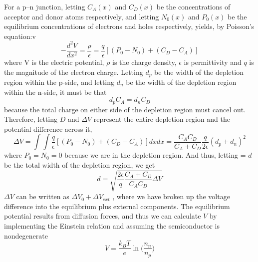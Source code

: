 For a p–n junction, letting  $C_A(x)$ and $C_D(x)$ be the concentrations of acceptor and donor atoms respectively, and letting  $N_0(x)$ and $P_0(x)$ be the equilibrium concentrations of electrons and holes respectively, yields, by Poisson's equation:v
$$
-\frac{d^2V}{dx^2} = \frac{\rho}{\epsilon} = \frac{q}{\epsilon}[(P_0 - N_0) + (C_D - C_A)]
$$
where V is the electric potential, $\rho$ is the charge density, $\epsilon$ is permittivity and $q$ is the magnitude of the electron charge. Letting $d_p$  be the width of the depletion region within the p-side, and letting $d_n$ be the width of the depletion region within the n-side, it must be that
$$
d_pC_A = d_nC_D
$$
because the total charge on either side of the depletion region must cancel out. Therefore, letting $D$ and $\Delta V$ represent the entire depletion region and the potential difference across it,
$$
\Delta V = \int \int \frac{q}{\epsilon}[(P_0 - N_0) + (C_D - C_A)] dxdx = \frac{C_AC_D}{C_A + C_D} \frac{q}{2\epsilon} (d_p + d_n)^2
$$
where $P_0 = N_0 = 0$ because we are in the depletion region. And thus, letting = $d$ be the total width of the depletion region, we get
$$
d = \sqrt{\frac{2 \epsilon}{q} \frac{C_A + C_D}{C_AC_D} \Delta V}
$$
$\Delta V$ can be written as $\Delta V_0 + \Delta V_{ext}$ , where we have broken up the voltage difference into the equilibrium plus external components. The equilibrium potential results from diffusion forces, and thus we can calculate $V$  by implementing the Einstein relation and assuming the semiconductor is nondegenerate
$$
V = \frac{k_B T}{e} \ln\bigg(\frac{n_n}{n_p}\bigg)
$$